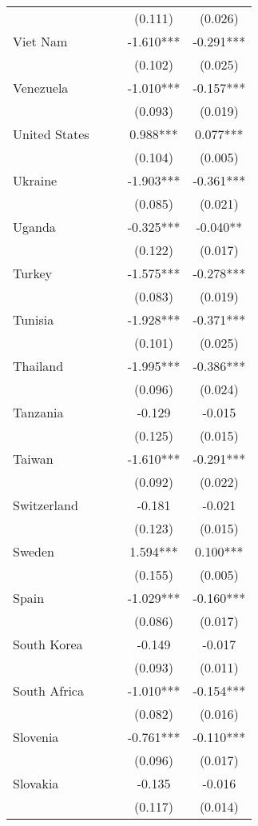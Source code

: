 \documentclass[]{article}
\begin{document}
\begin{tabular}{lcccc}
 &  &  & (0.111) & (0.026) \\
Viet Nam &  &  & -1.610*** & -0.291*** \\
 &  &  & (0.102) & (0.025) \\
Venezuela &  &  & -1.010*** & -0.157*** \\
 &  &  & (0.093) & (0.019) \\
United States &  &  & 0.988*** & 0.077*** \\
 &  &  & (0.104) & (0.005) \\
Ukraine &  &  & -1.903*** & -0.361*** \\
 &  &  & (0.085) & (0.021) \\
Uganda &  &  & -0.325*** & -0.040** \\
 &  &  & (0.122) & (0.017) \\
Turkey &  &  & -1.575*** & -0.278*** \\
 &  &  & (0.083) & (0.019) \\
Tunisia &  &  & -1.928*** & -0.371*** \\
 &  &  & (0.101) & (0.025) \\
Thailand &  &  & -1.995*** & -0.386*** \\
 &  &  & (0.096) & (0.024) \\
Tanzania &  &  & -0.129 & -0.015 \\
 &  &  & (0.125) & (0.015) \\
Taiwan &  &  & -1.610*** & -0.291*** \\
 &  &  & (0.092) & (0.022) \\
Switzerland &  &  & -0.181 & -0.021 \\
 &  &  & (0.123) & (0.015) \\
Sweden &  &  & 1.594*** & 0.100*** \\
 &  &  & (0.155) & (0.005) \\
Spain &  &  & -1.029*** & -0.160*** \\
 &  &  & (0.086) & (0.017) \\
South Korea &  &  & -0.149 & -0.017 \\
 &  &  & (0.093) & (0.011) \\
South Africa &  &  & -1.010*** & -0.154*** \\
 &  &  & (0.082) & (0.016) \\
Slovenia &  &  & -0.761*** & -0.110*** \\
 &  &  & (0.096) & (0.017) \\
Slovakia &  &  & -0.135 & -0.016 \\
 &  &  & (0.117) & (0.014) \\

\end{tabular}
\end{document}
